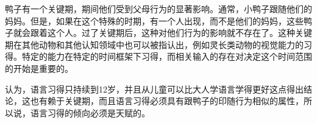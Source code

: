 鸭子有一个关键期，期间他们受到父母行为的显著影响。通常，小鸭子跟随他们的妈妈。但是，如果在这个特殊的时期，有一个人出现，而不是他们的妈妈，这些鸭子就会跟着这个人。过了关键期后，这种对他们行为的影响就不存在了\citep{Lorenz70a-u}。这种关键期在其他动物和其他认知领域中也可以被指认出，例如灵长类动物的视觉能力的习得。特定的能力在特定的时间框架下习得，而相关输入的存在对决定这个时间范围的开始是重要的。

\citet{Lenneberg64a}认为，语言习得只持续到12岁，并且从儿童可以比大人学语言学得更好这点得出结论，这也有赖于关键期，而且语言习得必须具有跟鸭子的印随行为相似的属性，所以说，语言习得的倾向必须是天赋的\citep[Chapter~4]{Lenneberg67a-u}。

